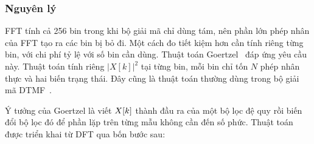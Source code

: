 \documentclass{dtmf_report}
\begin{document}
\subsubsection{Nguyên lý}

FFT tính cả 256 bin trong khi bộ giải mã chỉ dùng tám, nên phần lớn phép nhân của
FFT tạo ra các bin bị bỏ đi. Một cách đo tiết kiệm hơn cần tính riêng từng bin, với
chi phí tỷ lệ với số bin cần dùng. Thuật toán Goertzel~\cite{goertzel1958} đáp ứng
yêu cầu này. Thuật toán tính riêng $|X[k]|^{2}$ tại từng bin, mỗi bin chỉ tốn $N$
phép nhân thực và hai biến trạng thái. Đây cũng là thuật toán thường dùng trong bộ
giải mã DTMF~\cite{marven_simple_dsp}.

Ý tưởng của Goertzel là viết $X[k]$ thành đầu ra của một bộ lọc đệ quy rồi biến
đổi bộ lọc đó để phần lặp trên từng mẫu không cần đến số phức. Thuật toán được
triển khai từ DFT qua bốn bước sau:
\end{document}
